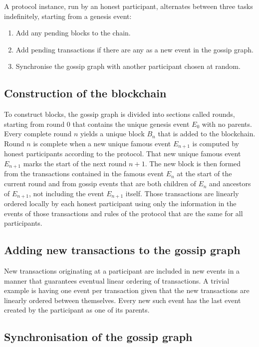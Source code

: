 \documentclass[a4paper,11pt]{article}
\begin{document}
A protocol instance, run by an honest participant, alternates between three tasks indefinitely,
starting from a genesis event:

\begin{enumerate}
\item Add any pending blocks to the chain.
\item Add pending transactions if there are any as a new event in the gossip graph.
\item Synchronise the gossip graph with another participant chosen at random.
\end{enumerate}


\subsection{Construction of the blockchain}

To construct blocks, the gossip graph is divided into sections called rounds, starting from round 0
that contains the unique genesis event $E_0$ with no parents. Every complete round $n$ yields a
unique block $B_n$ that is added to the blockchain. Round $n$ is complete when a new unique famous
event $E_{n+1}$ is computed by honest participants according to the protocol. That new unique famous
event $E_{n+1}$ marks the start of the next round $n + 1$. The new block is then formed from the
transactions contained in the famous event $E_n$ at the start of the current round and from gossip
events that are both children of $E_n$ and ancestors of $E_{n+1}$, not including the event $E_{n+1}$
itself. Those transactions are linearly ordered locally by each honest participant using only the
information in the events of those transactions and rules of the protocol that are the same for all
participants.


\subsection{Adding new transactions to the gossip graph}

New transactions originating at a participant are included in new events in a manner that guarantees
eventual linear ordering of transactions. A trivial example is having one event per transaction
given that the new transactions are linearly ordered between themselves. Every new such event has
the last event created by the participant as one of its parents.


\subsection{Synchronisation of the gossip graph}
\end{document}
